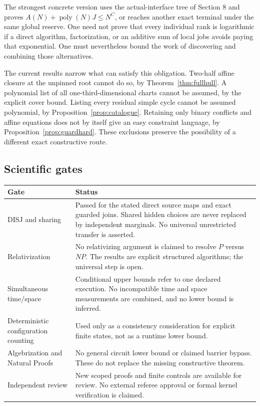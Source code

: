 \documentclass[11pt,letterpaper]{article}
\theoremstyle{definition}
\newcommand{\poly}{\operatorname{poly}}
\begin{document}
The strongest concrete version uses the actual-interface tree of Section 8 and proves $A(N)+\poly(N)J\le N^C$, or reaches another exact terminal under the same global reserve. One need not prove that every individual rank is logarithmic if a direct algorithm, factorization, or an additive sum of local jobs avoids paying that exponential. One must nevertheless bound the work of discovering and combining those alternatives.

The current results narrow what can satisfy this obligation. Two-half affine closure at the unpinned root cannot do so, by Theorem~\ref{thm:fullhull}. A polynomial list of all one-third-dimensional charts cannot be assumed, by the explicit cover bound. Listing every residual simple cycle cannot be assumed polynomial, by Proposition~\ref{prop:catalogue}. Retaining only binary conflicts and affine equations does not by itself give an easy constraint language, by Proposition~\ref{prop:guardhard}. These exclusions preserve the possibility of a different exact constructive route.

\subsection{Scientific gates}

\begin{longtable}{p{}p{}}
\toprule
Gate & Status\\
\midrule
\endhead
DISJ and sharing & Passed for the stated direct source maps and exact guarded joins. Shared hidden choices are never replaced by independent marginals. No universal unrestricted transfer is asserted.\\
Relativization & No relativizing argument is claimed to resolve $P$ versus $NP$. The results are explicit structured algorithms; the universal step is open.\\
Simultaneous time/space & Conditional upper bounds refer to one declared execution. No incompatible time and space measurements are combined, and no lower bound is inferred.\\
Deterministic configuration counting & Used only as a consistency consideration for explicit finite states, not as a runtime lower bound.\\
Algebrization and Natural Proofs & No general circuit lower bound or claimed barrier bypass. These do not replace the missing constructive theorem.\\
Independent review & New scoped proofs and finite controls are available for review. No external referee approval or formal kernel verification is claimed.\\
\bottomrule
\end{longtable}
\end{document}
